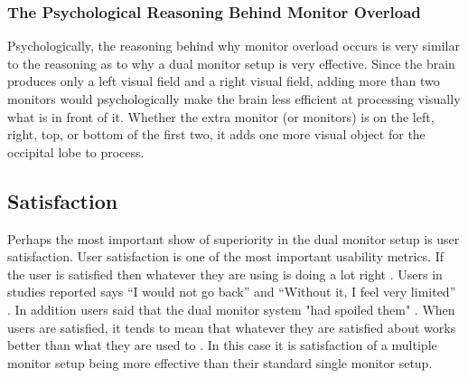\documentclass[a4paper]{article}
\begin{document}
\subsubsection{The Psychological Reasoning Behind Monitor Overload}
Psychologically, the reasoning behind why monitor overload occurs is very similar to the reasoning as to why a dual monitor setup is very effective. Since the brain produces only a left visual field and a right visual field, adding more than two monitors would psychologically make the brain less efficient at processing visually what is in front of it. Whether the extra monitor (or monitors) is on the left, right, top, or bottom of the first two, it adds one more visual object for the occipital lobe to process.

\subsection{Satisfaction}
Perhaps the most important show of superiority in the dual monitor setup is user satisfaction. User satisfaction is one of the most important usability metrics. If the user is satisfied then whatever they are using is doing a lot right \cite{Nielsen}. Users in studies reported says ``I would not go back'' and ``Without it, I feel very limited'' \cite{Grudin}. In addition users said that the dual monitor system "had spoiled them" \cite{Grudin}. When users are satisfied, it tends to mean that whatever they are satisfied about works better than what they are used to \cite{Nielsen}. In this case it is satisfaction of a multiple monitor setup being more effective than their standard single monitor setup.
\end{document}
